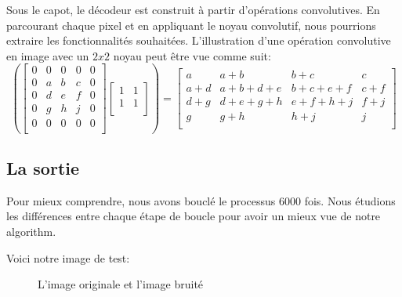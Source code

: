 \documentclass[
  11pt,
  dvipsnames]{article}
\begin{document}
Sous le capot, le décodeur est construit à partir d'opérations convolutives.
En parcourant chaque pixel et en appliquant le noyau convolutif, nous pourrions extraire les fonctionnalités souhaitées. L'illustration d'une opération convolutive en image avec un \(2 x 2\) noyau peut être vue comme suit:
\[\left(\begin{bmatrix}
  0 & 0 & 0 & 0 & 0\\
  0 & a & b & c & 0\\
  0 & d & e & f & 0\\
  0 & g & h & j & 0\\
  0 & 0 & 0 & 0 & 0\\
\end{bmatrix}
\begin{bmatrix}
  1 & 1\\
  1 & 1\\
\end{bmatrix}\right) =
\begin{bmatrix}
  a & a+b & b+c & c\\
  a+d & a+b+d+e & b+c+e+f & c+f\\
  d+g & d+e+g+h & e+f+h+j & f+j\\
  g & g+h & h+j & j\\
\end{bmatrix}
\]

\hypertarget{la-sortie}{%
\subsection{La sortie}\label{la-sortie}}

Pour mieux comprendre, nous avons bouclé le processus 6000 fois. Nous étudions
les différences entre chaque étape de boucle pour avoir un mieux vue de notre
algorithm.

Voici notre image de test:

\begin{figure}

{\centering {}

}

\caption{L'image originale et l'image bruité}\label{fig:noisy-original-image}
\end{figure}
\end{document}
